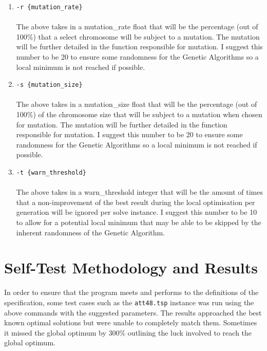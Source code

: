 \documentclass[12pt]{article}
\begin{document}
\begin{enumerate}
	\pagebreak
	
	\item \texttt{-r \{mutation\_rate\}}\\\\
	The above takes in a mutation\_rate float that will be the percentage (out of 100\%) that a select chromosome will be subject to a mutation. The mutation will be further detailed in the function responsible for mutation. I suggest this number to be 20 to ensure some randomness for the Genetic Algorithms so a local minimum is not reached if possible.\\
	
	\item \texttt{-s \{mutation\_size\}}\\\\
	The above takes in a mutation\_size float that will be the percentage (out of 100\%) of the chromosome size that will be subject to a mutation when chosen for mutation. The mutation will be further detailed in the function responsible for mutation. I suggest this number to be 20 to ensure some randomness for the Genetic Algorithms so a local minimum is not reached if possible.\\
	
	\item \texttt{-t \{warn\_threshold\}}\\\\
	The above takes in a warn\_threshold integer that will be the amount of times that a non-improvement of the best result during the local optimisation per generation will be ignored per solve instance. I suggest this number to be 10 to allow for a potential local minimum that may be able to be skipped by the inherent randomness of the Genetic Algorithm.\\
\end{enumerate}

\section{Self-Test Methodology and Results}
In order to ensure that the program meets and performs to the definitions of the specification, some test cases such as the \texttt{att48.tsp} instance was run using the above commands with the suggested parameters. The results approached the best known optimal solutions but were unable to completely match them. Sometimes it missed the global optimum by 300\% outlining the luck involved to reach the global optimum.
\end{document}
